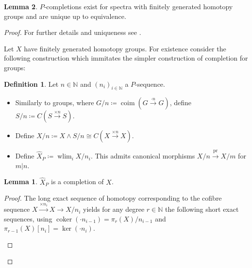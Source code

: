 \documentclass[english]{scrartcl}
\theoremstyle{definition}
\newtheorem*{Def}{Definition}
\newtheorem*{Lem}{Lemma}
\theoremstyle{remark}
\newcommand*{\N}{\mathds{N}}
\newcommand*{\smashed}{\wedge}
\newcommand*{\Cone}[1]{C(#1)}
\newcommand*{\Sph}{S} %
\newcommand*{\Ps}{P}  %
\newcommand*{\pistar}[2][*]{\pi_{#1}(#2)}  %
\newcommand*{\compl}[2][\Ps]{\hat{#2}_{#1}}  %
\DeclareMathOperator{\wlim}{wlim}  %
\begin{document}
\begin{Lem}
  $\Ps$-completions exist for spectra with finitely generated homotopy
  groups and are unique up to equivalence.
  \begin{proof}
    For further details and uniqueness see \cite[Thm. 9.1]{margolis}.

    Let $X$ have finitely generated homotopy groups. For existence
    consider the following construction which immitates the simpler
    construction of completion for groups:
    \begin{Def}
      Let $n\in\N$ and $(n_i)_{i\in\N}$ a $\Ps$-sequence.
      \begin{itemize}
      \item Similarly to groups, where
        $G/n\coloneqq \operatorname{coim}(G\xrightarrow{\cdot n} G)$,
        define
        $\Sph/n\coloneqq\Cone{\Sph\xrightarrow{\times n}\Sph}$.
      \item Define $X/n\coloneqq X\smashed S/n
        \cong \Cone{X\xrightarrow{\times n} X}$.
      \item Define 
        $\compl{X}\coloneqq\wlim_{i} X/n_i$.
        This admits canonical morphisms $X/n\xrightarrow{\text{pr}} X/m$ for $m|n$.
      \end{itemize}
    \end{Def}
    \begin{Lem}
      $\compl{X}$ is a completion of $X$.
      \begin{proof}
        The long exact sequence of homotopy corresponding to the
        cofibre sequence $X\xrightarrow{\times n_i}X\to X/n_i$
        yields for any degree $r\in\N$ the following short exact
        sequences, using
        $\operatorname{coker}(\cdot n_{i-1}) = \pistar[r]{X}/n_{i-1}$
        and
        $\pistar[r-1]{X}[n_i] = \operatorname{ker}(\cdot n_i)$.
        \begin{center}
\end{center}
\end{proof}
\end{Lem}
\end{proof}
\end{Lem}
\end{document}
